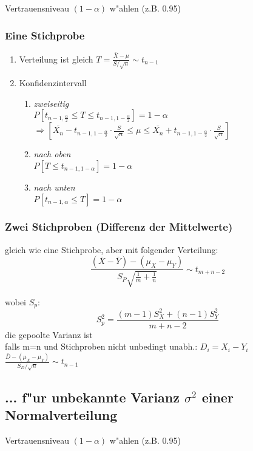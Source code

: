 \documentclass[10pt, a4paper, twocolumn]{scrartcl}
\begin{document}
Vertrauensniveau $(1-\alpha)$ w"ahlen (z.B. 0.95)

\subsubsection{Eine Stichprobe}

\begin{enumerate}
 \item Verteilung ist gleich $T=\frac{\bar{X}-\mu}{S/\sqrt{n}}\sim t_{n-1}$
 \item Konfidenzintervall
  \begin{enumerate}
   \item \textit{zweiseitig}\\
    $P[t_{n-1,\frac{\alpha}{2}}\leq T \leq t_{n-1,1-\frac{\alpha}{2}}]=1-\alpha$\\
    $\Rightarrow [\bar{X_n}-t_{n-1,1-\frac{\alpha}{2}}\cdotp\frac{S}{\sqrt{n}}\leq \mu \leq \bar{X_n}+t_{n-1,1-\frac{\alpha}{2}}\cdotp\frac{S}{\sqrt{n}}]$
   \item \textit{nach oben}\\
    $P[T \leq t_{n-1,1-\alpha}]=1-\alpha$
   \item \textit{nach unten}\\
    $P[t_{n-1,\alpha}\leq T]=1-\alpha$
  \end{enumerate}
\end{enumerate}

\subsubsection{Zwei Stichproben (Differenz der Mittelwerte)}

gleich wie eine Stichprobe, aber mit folgender Verteilung:
$$\frac{(\bar{X}-\bar{Y})-(\mu_X-\mu_Y)}{S_P\sqrt{\frac{1}{m}+\frac{1}{n}}}\sim t_{m+n-2}$$

wobei $S_p$:
$$S_p^2=\frac{(m-1)S_X^2+(n-1)S_Y^2}{m+n-2}$$
die gepoolte Varianz ist\\

falls m=n und Stichproben nicht unbedingt unabh.: $D_i=X_i-Y_i$\\
$\frac{\bar{D}-(\mu_X-\mu_Y)}{S_D/\sqrt{n}}\sim t_{n-1}$

\subsection{... f"ur unbekannte Varianz $\sigma^2$ einer Normalverteilung}

Vertrauensniveau $(1-\alpha)$ w"ahlen (z.B. 0.95)
\end{document}
